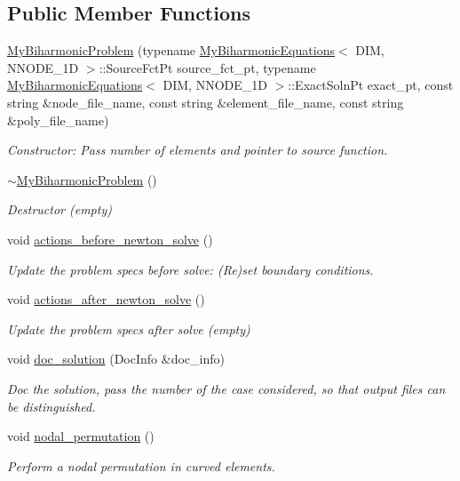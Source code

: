 \subsection*{Public Member Functions}
\begin{DoxyCompactItemize}
\item 
\hyperlink{classMyBiharmonicProblem_ab894abf54210a71c3b4e00e1b30e380e}{My\+Biharmonic\+Problem} (typename \hyperlink{classoomph_1_1MyBiharmonicEquations}{My\+Biharmonic\+Equations}$<$ D\+IM, N\+N\+O\+D\+E\+\_\+1D $>$\+::Source\+Fct\+Pt source\+\_\+fct\+\_\+pt, typename \hyperlink{classoomph_1_1MyBiharmonicEquations}{My\+Biharmonic\+Equations}$<$ D\+IM, N\+N\+O\+D\+E\+\_\+1D $>$\+::Exact\+Soln\+Pt exact\+\_\+pt, const string \&node\+\_\+file\+\_\+name, const string \&element\+\_\+file\+\_\+name, const string \&poly\+\_\+file\+\_\+name)
\begin{DoxyCompactList}\small\item\em Constructor\+: Pass number of elements and pointer to source function. \end{DoxyCompactList}\item 
\hyperlink{classMyBiharmonicProblem_ad6d1bdce803ec5fd13bf6b0e3b1f3ca9}{$\sim$\+My\+Biharmonic\+Problem} ()
\begin{DoxyCompactList}\small\item\em Destructor (empty) \end{DoxyCompactList}\item 
void \hyperlink{classMyBiharmonicProblem_ae9a9d6db2c84c3cc12138558b60d676d}{actions\+\_\+before\+\_\+newton\+\_\+solve} ()
\begin{DoxyCompactList}\small\item\em Update the problem specs before solve\+: (Re)set boundary conditions. \end{DoxyCompactList}\item 
void \hyperlink{classMyBiharmonicProblem_a0600c4a7dff6f362b6171c66e07b594c}{actions\+\_\+after\+\_\+newton\+\_\+solve} ()
\begin{DoxyCompactList}\small\item\em Update the problem specs after solve (empty) \end{DoxyCompactList}\item 
void \hyperlink{classMyBiharmonicProblem_aa1c9d6b8298b2b78f5df9343349ecd70}{doc\+\_\+solution} (Doc\+Info \&doc\+\_\+info)
\begin{DoxyCompactList}\small\item\em Doc the solution, pass the number of the case considered, so that output files can be distinguished. \end{DoxyCompactList}\item 
void \hyperlink{classMyBiharmonicProblem_a40167119fb35b4926185b7adc23a6358}{nodal\+\_\+permutation} ()
\begin{DoxyCompactList}\small\item\em Perform a nodal permutation in curved elements. \end{DoxyCompactList}\end{DoxyCompactItemize}
